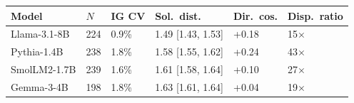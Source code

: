\begin{tabular}{llllll}
\toprule
 Model        & $N$   & IG CV   & Sol.\ dist.                & Dir.\ cos.   & Disp.\ ratio   \\
\midrule
 Llama-3.1-8B & 224   & 0.9\%   & 1.49 {\small [1.43, 1.53]} & +0.18        & 15$\times$     \\
 Pythia-1.4B  & 238   & 1.8\%   & 1.58 {\small [1.55, 1.62]} & +0.24        & 43$\times$     \\
 SmolLM2-1.7B & 239   & 1.6\%   & 1.61 {\small [1.58, 1.64]} & +0.10        & 27$\times$     \\
 Gemma-3-4B   & 198   & 1.8\%   & 1.63 {\small [1.61, 1.64]} & +0.04        & 19$\times$     \\
\bottomrule
\end{tabular}
